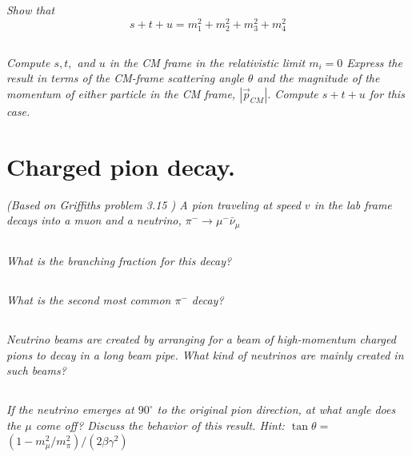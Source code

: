 \documentclass{article}
\begin{document}
\subsection{}
\textit{Show that
$$
s+t+u=m_{1}^{2}+m_{2}^{2}+m_{3}^{2}+m_{4}^{2}
$$}

\subsection{}
\textit{Compute $s, t,$ and $u$ in the CM frame in the relativistic limit $m_{i}=0$ Express the result in terms of the CM-frame scattering angle $\theta$ and the magnitude of the momentum of either particle in the CM frame, $\left|\vec{p}_{C M}\right|$. Compute $s+t+u$ for this case.}


\newpage


\section{Charged pion decay.}
\textit{(Based on Griffiths problem 3.15 ) A pion traveling at speed $v$ in the lab frame decays into a muon and a neutrino, $\pi^{-} \rightarrow \mu^{-} \bar{\nu}_{\mu}$}
\subsection{}
\textit{What is the branching fraction for this decay?}


\subsection{} 
\textit{What is the second most common $\pi^{-}$ decay?}

\subsection{} 
\textit{Neutrino beams are created by arranging for a beam of high-momentum charged pions to decay in a long beam pipe. What kind of neutrinos are mainly created in such beams?}

\subsection{} 
\textit{If the neutrino emerges at $90^{\circ}$ to the original pion direction, at what angle does the $\mu$ come off? Discuss the behavior of this result. Hint: $\tan \theta=$ $\left(1-m_{\mu}^{2} / m_{\pi}^{2}\right) /\left(2 \beta \gamma^{2}\right)$}
\end{document}
